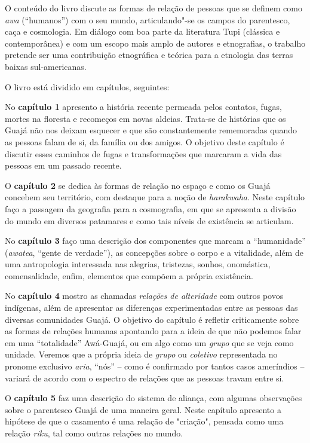 O conteúdo do livro discute as formas de relação de pessoas que se
definem como \emph{awa} (``humanos'') com o seu mundo, articulando"-se os
campos do parentesco, caça e cosmologia. Em diálogo com boa parte da
literatura Tupi (clássica e contemporânea) e com um escopo mais amplo de
autores e etnografias, o trabalho pretende ser uma contribuição
etnográfica e teórica para a etnologia das terras baixas sul-americanas.

O livro está dividido em capítulos, seguintes:

No \textbf{capítulo 1} apresento a história recente permeada pelos
contatos, fugas, mortes na floresta e recomeços em novas aldeias.
Trata-se de histórias que os Guajá não nos deixam esquecer e que são
constantemente rememoradas quando as pessoas falam de si, da família ou
dos amigos. O objetivo deste capítulo é discutir esses caminhos de fugas
e transformações que marcaram a vida das pessoas em um passado recente.

O \textbf{capítulo 2} se dedica às formas de relação no espaço e como os
Guajá concebem seu território, com destaque para a noção de
\emph{harakwaha}. Neste capítulo faço a passagem da geografia para a
cosmografia, em que se apresenta a divisão do mundo em diversos
patamares e como tais níveis de existência se articulam.

No \textbf{capítulo 3} faço uma descrição dos componentes que marcam a
``humanidade'' (\emph{awatea}, ``gente de verdade''), as concepções sobre
o corpo e a vitalidade, além de uma antropologia interessada nas
alegrias, tristezas, sonhos, onomástica, comensalidade, enfim, elementos
que compõem a própria existência.

No \textbf{capítulo 4} mostro as chamadas \emph{relações de alteridade}
com outros povos indígenas, além de apresentar as diferenças
experimentadas entre as pessoas das diversas comunidades Guajá. O
objetivo do capítulo é refletir criticamente sobre as formas de relações
humanas apontando para a ideia de que não podemos falar em uma
``totalidade'' Awá-Guajá, ou em algo como um \emph{grupo} que se veja
como unidade. Veremos que a própria ideia de \emph{grupo} ou
\emph{coletivo} representada no pronome exclusivo \emph{aria}, ``nós'' --
como é confirmado por tantos casos ameríndios -- variará de acordo com o
espectro de relações que as pessoas travam entre si.

O \textbf{capítulo 5} faz uma descrição do sistema de aliança, com
algumas observações sobre o parentesco Guajá de uma maneira geral. Neste
capítulo apresento a hipótese de que o casamento é uma relação de
"criação", pensada como uma relação \emph{riku}, tal como outras
relações no mundo.

